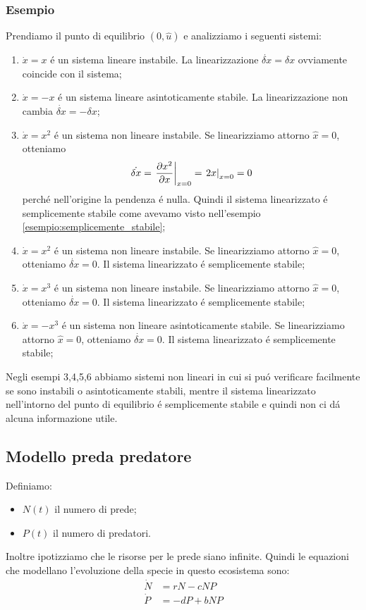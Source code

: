 \documentclass[../main.tex]{subfiles}
\begin{document}
	\subsubsection*{Esempio}
		Prendiamo il punto di equilibrio $ (0, \hat u) $ e analizziamo i seguenti sistemi:
		\begin{enumerate}
			\item
				$ \dot x = x $ \'e un sistema lineare instabile. La linearizzazione $ \dot{\delta x} = \delta x $ ovviamente coincide con il sistema;
			\item
				$ \dot x = -x $ \'e un sistema lineare asintoticamente stabile. La linearizzazione non cambia $ \dot{\delta x} = -\delta x $;
			\item
				$ \dot x = x^2 $ \'e un sistema non lineare instabile. Se linearizziamo attorno $ \hat x = 0 $, otteniamo
				\[ \dot{\delta x} = \left. \frac{\partial x^2}{\partial x} \right|_{x=0} = \left. 2x \right|_{x=0} = 0 \]
				perch\'e nell'origine la pendenza \'e nulla. Quindi il sistema linearizzato \'e semplicemente stabile come avevamo visto nell'esempio \ref{esempio:semplicemente_stabile};
			\item
				$ \dot x = x^2 $ \'e un sistema non lineare instabile. Se linearizziamo attorno $ \hat x = 0 $, otteniamo $ \dot{\delta x} = 0 $. Il sistema linearizzato \'e semplicemente stabile;
			\item
				$ \dot x = x^3 $ \'e un sistema non lineare instabile. Se linearizziamo attorno $ \hat x = 0 $, otteniamo $ \dot{\delta x} = 0 $. Il sistema linearizzato \'e semplicemente stabile;
			\item
				$ \dot x = -x^3 $ \'e un sistema non lineare asintoticamente stabile. Se linearizziamo attorno $ \hat x = 0 $, otteniamo $ \dot{\delta x} = 0 $. Il sistema linearizzato \'e semplicemente stabile;
		\end{enumerate}
		Negli esempi 3,4,5,6 abbiamo sistemi non lineari in cui si pu\'o verificare facilmente se sono instabili o asintoticamente stabili, mentre il sistema linearizzato nell'intorno del punto di equilibrio \'e semplicemente stabile e quindi non ci d\'a alcuna informazione utile.
		
	\subsection{Modello preda predatore}
		Definiamo:
		\begin{itemize}
			\item $ N(t) $ il numero di prede;
			\item $ P(t) $ il numero di predatori.
		\end{itemize}
		Inoltre ipotizziamo che le risorse per le prede siano infinite. Quindi le equazioni che modellano l'evoluzione della specie in questo ecosistema sono:
		\begin{align*}
			\dot N &= rN - cNP\\
			\dot P &= -dP + bNP
		\end{align*}
		
\end{document}
